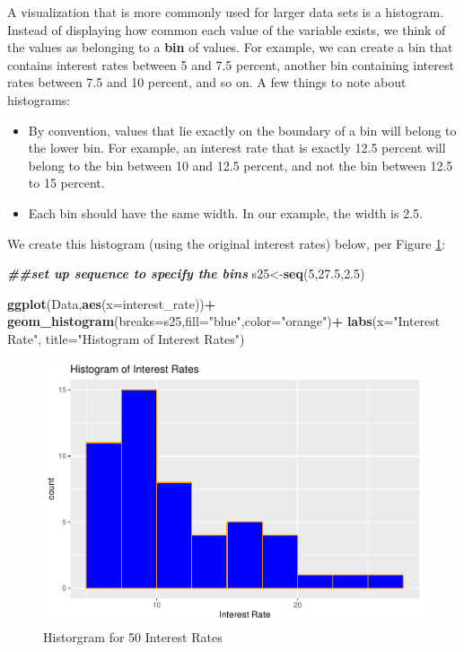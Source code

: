 \documentclass[
]{book}
\newenvironment{Shaded}{\begin{snugshade}}{\end{snugshade}}
\newcommand{\AttributeTok}[1]{\textcolor[rgb]{0.13,0.29,0.53}{#1}}
\newcommand{\DecValTok}[1]{\textcolor[rgb]{0.00,0.00,0.81}{#1}}
\newcommand{\DocumentationTok}[1]{\textcolor[rgb]{0.56,0.35,0.01}{\textbf{\textit{#1}}}}
\newcommand{\FloatTok}[1]{\textcolor[rgb]{0.00,0.00,0.81}{#1}}
\newcommand{\FunctionTok}[1]{\textcolor[rgb]{0.13,0.29,0.53}{\textbf{#1}}}
\newcommand{\NormalTok}[1]{#1}
\newcommand{\OtherTok}[1]{\textcolor[rgb]{0.56,0.35,0.01}{#1}}
\newcommand{\SpecialCharTok}[1]{\textcolor[rgb]{0.81,0.36,0.00}{\textbf{#1}}}
\newcommand{\StringTok}[1]{\textcolor[rgb]{0.31,0.60,0.02}{#1}}
\begin{document}
A visualization that is more commonly used for larger data sets is a histogram. Instead of displaying how common each value of the variable exists, we think of the values as belonging to a \textbf{bin} of values. For example, we can create a bin that contains interest rates between 5 and 7.5 percent, another bin containing interest rates between 7.5 and 10 percent, and so on. A few things to note about histograms:

\begin{itemize}
\item
  By convention, values that lie exactly on the boundary of a bin will belong to the lower bin. For example, an interest rate that is exactly 12.5 percent will belong to the bin between 10 and 12.5 percent, and not the bin between 12.5 to 15 percent.
\item
  Each bin should have the same width. In our example, the width is 2.5.
\end{itemize}

We create this histogram (using the original interest rates) below, per Figure \ref{fig:hist}:

\begin{Shaded}
\begin{Highlighting}[]
\DocumentationTok{\#\#set up sequence to specify the bins}
\NormalTok{s25}\OtherTok{\textless{}{-}}\FunctionTok{seq}\NormalTok{(}\DecValTok{5}\NormalTok{,}\FloatTok{27.5}\NormalTok{,}\FloatTok{2.5}\NormalTok{)}

\FunctionTok{ggplot}\NormalTok{(Data,}\FunctionTok{aes}\NormalTok{(}\AttributeTok{x=}\NormalTok{interest\_rate))}\SpecialCharTok{+}
  \FunctionTok{geom\_histogram}\NormalTok{(}\AttributeTok{breaks=}\NormalTok{s25,}\AttributeTok{fill=}\StringTok{"blue"}\NormalTok{,}\AttributeTok{color=}\StringTok{"orange"}\NormalTok{)}\SpecialCharTok{+}
  \FunctionTok{labs}\NormalTok{(}\AttributeTok{x=}\StringTok{"Interest Rate"}\NormalTok{, }\AttributeTok{title=}\StringTok{"Histogram of Interest Rates"}\NormalTok{)}
\end{Highlighting}
\end{Shaded}

\begin{figure}
\centering
\includegraphics{bookdown-demo_files/figure-latex/hist-1.pdf}
\caption{\label{fig:hist}Historgram for 50 Interest Rates}
\end{figure}
\end{document}
